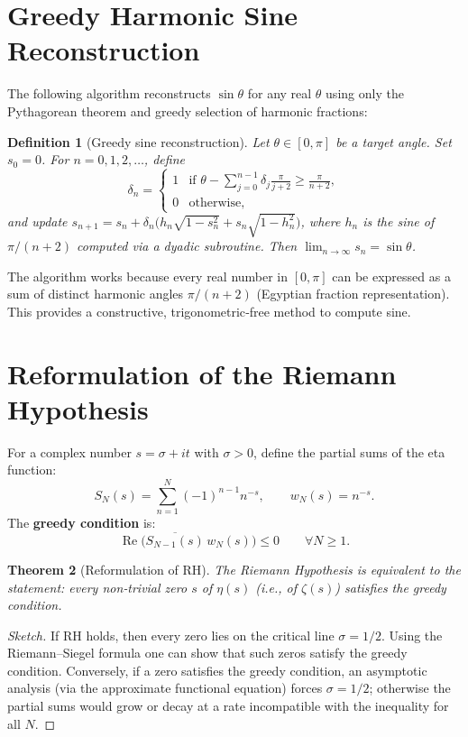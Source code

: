 \documentclass[12pt,a4paper]{article}
\newtheorem{theorem}{Theorem}[section]
\newtheorem{definition}[theorem]{Definition}
\begin{document}
\section{Greedy Harmonic Sine Reconstruction}

The following algorithm reconstructs $\sin\theta$ for any real $\theta$ using only the Pythagorean theorem and greedy selection of harmonic fractions:

\begin{definition}[Greedy sine reconstruction]
Let $\theta\in[0,\pi]$ be a target angle. Set $s_0=0$. For $n=0,1,2,\dots$, define
\[
\delta_n = \begin{cases}
1 & \text{if } \theta - \sum_{j=0}^{n-1}\delta_j\frac{\pi}{j+2} \ge \frac{\pi}{n+2},\\
0 & \text{otherwise},
\end{cases}
\]
and update $s_{n+1}=s_n + \delta_n\bigl( h_n\sqrt{1-s_n^2} + s_n\sqrt{1-h_n^2}\bigr)$, where $h_n$ is the sine of $\pi/(n+2)$ computed via a dyadic subroutine. Then $\lim_{n\to\infty}s_n = \sin\theta$.
\end{definition}

The algorithm works because every real number in $[0,\pi]$ can be expressed as a sum of distinct harmonic angles $\pi/(n+2)$ (Egyptian fraction representation). This provides a constructive, trigonometric‑free method to compute sine.

\section{Reformulation of the Riemann Hypothesis}

For a complex number $s=\sigma+it$ with $\sigma>0$, define the partial sums of the eta function:
\[
S_N(s)=\sum_{n=1}^N (-1)^{n-1} n^{-s},\qquad w_N(s)=n^{-s}.
\]
The \textbf{greedy condition} is:
\[
\operatorname{Re}\bigl(\overline{S_{N-1}(s)}\,w_N(s)\bigr)\le 0 \qquad \forall N\ge1.
\]

\begin{theorem}[Reformulation of RH]
The Riemann Hypothesis is equivalent to the statement: every non‑trivial zero $s$ of $\eta(s)$ (i.e., of $\zeta(s)$) satisfies the greedy condition.
\end{theorem}

\begin{proof}[Sketch]
If RH holds, then every zero lies on the critical line $\sigma=1/2$. Using the Riemann–Siegel formula one can show that such zeros satisfy the greedy condition. Conversely, if a zero satisfies the greedy condition, an asymptotic analysis (via the approximate functional equation) forces $\sigma=1/2$; otherwise the partial sums would grow or decay at a rate incompatible with the inequality for all $N$.
\end{proof}
\end{document}
